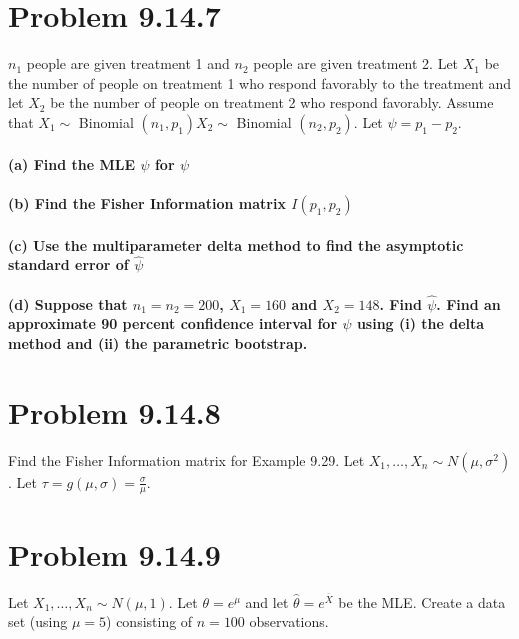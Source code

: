 \documentclass{article}\usepackage[]{graphicx}\usepackage[]{color}
\begin{document}
\section{Problem 9.14.7}
$n_1$ people are given treatment 1 and $n_2$ people are given treatment 2. Let $X_1$ be the number of people on treatment 1 who respond favorably to the treatment and let $X_2$ be the number of people on treatment 2 who respond favorably. Assume that $X_{1} \sim$ Binomial $(n_{1},p_{1}) X_{2} \sim$ Binomial $(n_{2}, p_{2})$. Let $\psi = p_{1}-p_{2}$. 

\paragraph*{(a) Find the MLE $\hat{\psi}$ for $\psi$}

\paragraph*{(b) Find the Fisher Information matrix $I(p_{1},p_{2})$}

\paragraph*{(c) Use the multiparameter delta method to find the asymptotic standard error of $\hat{\psi}$}

\paragraph*{(d) Suppose that $n_{1} = n_{2} = 200$, $X_{1} = 160$ and $X_{2} = 148$. Find $\hat{\psi}$. Find an approximate 90 percent confidence interval for $\psi$ using (i) the delta method and (ii) the parametric bootstrap.}


\section{Problem 9.14.8}
Find the Fisher Information matrix for Example 9.29. Let $X_{1}, \ldots, X_{n} \sim N (\mu,\sigma^{2})$. Let $\tau = g(\mu,\sigma) = \frac{\sigma}{\mu}$.





\section{Problem 9.14.9}
Let $X_{1}, \ldots, X_{n} \sim N(\mu,1)$. Let $\theta = e^{\mu}$ and let $\hat{\theta} = e^{\overline{X}}$ be the MLE. Create a data set (using $\mu = 5$) consisting of $n = 100$ observations. 
\end{document}
